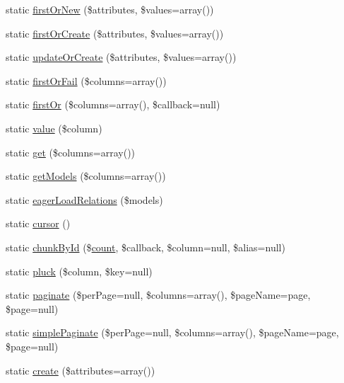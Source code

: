 \begin{DoxyCompactItemize}
\item 
static \mbox{\hyperlink{class_eloquent_a462f0af15dd12a99bc154d8f3808b594}{first\+Or\+New}} (\$attributes, \$values=array())
\item 
static \mbox{\hyperlink{class_eloquent_a1cbf899f6b24ec8dcd888d69bf17e21d}{first\+Or\+Create}} (\$attributes, \$values=array())
\item 
static \mbox{\hyperlink{class_eloquent_a215b8431dad0c732d5b8650df9fc1476}{update\+Or\+Create}} (\$attributes, \$values=array())
\item 
static \mbox{\hyperlink{class_eloquent_a013e6c21af18280b92abc71a1ea88763}{first\+Or\+Fail}} (\$columns=array())
\item 
static \mbox{\hyperlink{class_eloquent_a77202ee7dec38ef2364d93ed60643ede}{first\+Or}} (\$columns=array(), \$callback=null)
\item 
static \mbox{\hyperlink{class_eloquent_a653061eb837042f61e82447886e15a72}{value}} (\$column)
\item 
static \mbox{\hyperlink{class_eloquent_a6c45f389bc6894c7f4b37a8e0b9bc700}{get}} (\$columns=array())
\item 
static \mbox{\hyperlink{class_eloquent_a20abe0ed9fc973599d443fb3a9302394}{get\+Models}} (\$columns=array())
\item 
static \mbox{\hyperlink{class_eloquent_ad3df22a0761eea733b9007d0f70d3369}{eager\+Load\+Relations}} (\$models)
\item 
static \mbox{\hyperlink{class_eloquent_a7c3fb913f8b3492f3d62ed0de9e1080d}{cursor}} ()
\item 
static \mbox{\hyperlink{class_eloquent_a546b19f3697175b86e7860c186f3b592}{chunk\+By\+Id}} (\$\mbox{\hyperlink{class_eloquent_af7f114e287681eb2333c97d6bf26285d}{count}}, \$callback, \$column=null, \$alias=null)
\item 
static \mbox{\hyperlink{class_eloquent_afe73f673c6d6d904f677ecb1ab1036ae}{pluck}} (\$column, \$key=null)
\item 
static \mbox{\hyperlink{class_eloquent_a772255be01bb78f48d5e817299913aae}{paginate}} (\$per\+Page=null, \$columns=array(), \$page\+Name=\textquotesingle{}page\textquotesingle{}, \$page=null)
\item 
static \mbox{\hyperlink{class_eloquent_a62be57b10fee0b64068fe6ea7ee6f528}{simple\+Paginate}} (\$per\+Page=null, \$columns=array(), \$page\+Name=\textquotesingle{}page\textquotesingle{}, \$page=null)
\item 
static \mbox{\hyperlink{class_eloquent_af00cc719bafb53826d7adb0a4e79ed07}{create}} (\$attributes=array())

\end{DoxyCompactItemize}
